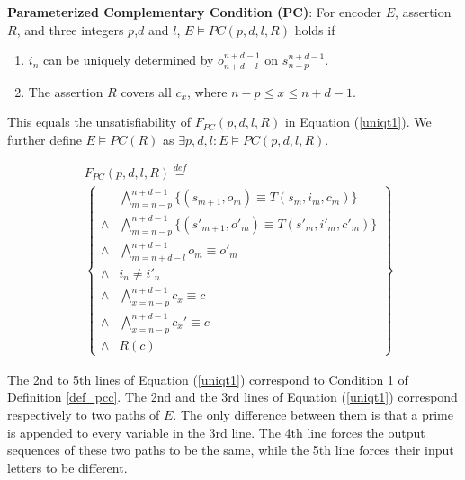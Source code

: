 \documentclass{sig-alternate}
\begin{document}
\begin{definition11}\label{def_pcc}%
\textbf{Parameterized Complementary Condition (PC)}:
For encoder $E$,
assertion $R$,
and three integers $p$,$d$ and $l$,
$E\vDash PC(p,d,l,R)$ holds if
\begin{enumerate}
 \item $i_n$ can be uniquely determined by $o_{n+d-l}^{n+d-1}$ on $s_{n-p}^{n+d-1}$.
 \item The assertion $R$ covers all $c_x$, where $n-p\le x\le n+d-1$.
\end{enumerate}

This equals the unsatisfiability of $F_{PC}(p,d,l,R)$ in Equation (\ref{uniqt1}).
We further define $E\vDash PC(R)$ as $\exists p,d,l:E\vDash PC(p,d,l,R)$.
\end{definition11}

\begin{equation}\label{uniqt1}
\begin{split}
&F_{PC}(p,d,l,R)\stackrel{def}{=}\\
&\left\{
\begin{array}{cc}
&\bigwedge_{m=n-p}^{n+d-1}
\{
(s_{m+1},o_m)\equiv T(s_m,i_m,c_m)
\}
\\
\wedge&\bigwedge_{m=n-p}^{n+d-1}
\{
(s'_{m+1},o'_m)\equiv T(s'_m,i'_m,c'_m)
\}
\\
\wedge&\bigwedge_{m=n+d-l}^{n+d-1}o_m\equiv o'_m \\
\wedge& i_n\ne i'_n \\
\wedge&\bigwedge_{x=n-p}^{n+d-1}c_x\equiv c \\
\wedge&\bigwedge_{x=n-p}^{n+d-1}c_x'\equiv c \\
\wedge& R(c)
\end{array}
\right\}
\end{split}
\end{equation}


The 2nd to 5th lines of Equation (\ref{uniqt1}) correspond to Condition 1 of Definition \ref{def_pcc}.
The 2nd and the 3rd lines of Equation (\ref{uniqt1}) correspond respectively to two paths of $E$.
The only difference between them is that a prime is appended to every variable in the 3rd line.
The 4th line forces the output sequences of these two paths to be the same,
while the 5th line forces their input letters to be different.
\end{document}
